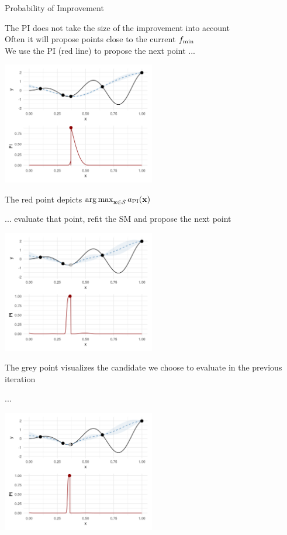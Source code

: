 \documentclass[11pt,compress,t,notes=noshow, xcolor=table]{beamer}
\begin{document}
\begin{vbframe}{Probability of Improvement}
\framebreak

The PI does not take the size of the improvement into account\\
\vspace{1em}
Often it will propose points close to the current $f_{\min}$\\
\vspace{1em}
We use the PI (red line) to propose the next point ...

\begin{center}
  \includegraphics[width = 0.5\textwidth]{figure_man/bayesian_loop_pi_1.png}
\end{center}

The red point depicts $\operatorname{arg\,max}_{\mathbf{x} \in \mathcal{S}} a_{\text{PI}}(\mathbf{x})$

\framebreak

... evaluate that point, refit the SM and propose the next point

\begin{center}
  \includegraphics[width = 0.5\textwidth]{figure_man/bayesian_loop_pi_2.png}
\end{center}

The grey point visualizes the candidate we choose to evaluate in the previous iteration

\framebreak

...

\begin{center}
  \includegraphics[width = 0.5\textwidth]{figure_man/bayesian_loop_pi_3.png}
\end{center}


\end{vbframe}
\end{document}
